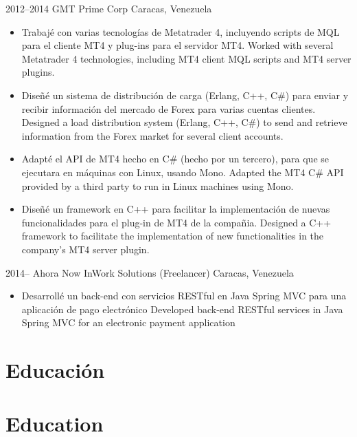 \documentclass[]{friggeri-cv} %
\newcommand{\chl}[2]{
    \ifdefined\isspanish
        #2
    \else
        #1
    \fi
}
\newcommand{\chlsection}[2]{
    \ifdefined\isspanish
        \section{#2}
    \else
        \section{#1}
    \fi
}
\begin{document}
\begin{entrylist}
\entry
{2012--2014}
{GMT Prime Corp}
{Caracas, Venezuela}
{\begin{itemize}
  \item \chl{Worked with several Metatrader 4 technologies, including MT4 client MQL
scripts and MT4 server plugins.}{Trabajé con varias tecnologías de Metatrader 4,
incluyendo scripts de MQL para el cliente MT4 y plug-ins para el servidor MT4.}
  \item \chl{Designed a load distribution system (Erlang, C++, C\#) to send and retrieve
information from the Forex market for several client accounts.}{Diseñé un sistema
de distribución de carga (Erlang, C++, C\#) para enviar y recibir información del
mercado de Forex para varias cuentas clientes.}
  \item \chl{Adapted the MT4 C\# API provided by a third party to run in Linux machines
using Mono.}{Adapté el API de MT4 hecho en C\# (hecho por un tercero), para que
se ejecutara en máquinas con Linux, usando Mono.}
  \item \chl{Designed a C++ framework to facilitate the implementation of new
functionalities in the company's MT4 server plugin.}{Diseñé un framework en C++
para facilitar la implementación de nuevas funcionalidades para el plug-in de
MT4 de la compañia.}
\end{itemize}}
\entry
{2014--\chl{Now}{Ahora}}
{InWork Solutions (Freelancer)}
{Caracas, Venezuela}
{\begin{itemize}
  \item \chl{Developed back-end RESTful services in Java Spring MVC for an electronic payment
application}{Desarrollé un back-end con servicios RESTful en Java Spring MVC para una aplicación
de pago electrónico}
\end{itemize}}
\end{entrylist}


\chlsection{Education}{Educación}
\end{document}

